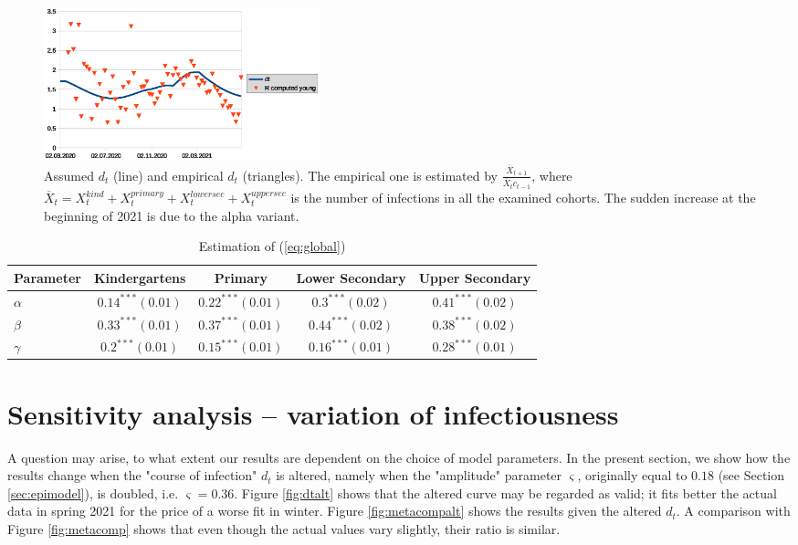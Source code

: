 \documentclass[fleqn,10pt]{wlscirep}
\begin{document}
\begin{figure}
\begin{center}
\includegraphics[width=8cm]{dt.eps} 
\caption{Assumed $d_t$ (line) and  empirical $d_t$ (triangles). The empirical one is estimated by 
$\frac{\overline{X}_{t+1}}{\overline{X}_{t} c_{t-1}}$, where $\overline{X}_{t}=X^{kind}_t+X^{primary}_t+X^{lowersec}_t+X^{uppersec}_t$ is the number of infections in all the examined cohorts. The sudden increase at the beginning of 2021 is due to the alpha variant.
}
\label{fig:dt}
\end{center}
\end{figure}

\begin{table}
\begin{center}
\begin{tabular}{l|cccc} Parameter & Kindergartens & Primary & Lower Secondary & Upper Secondary \\ \hline 
$\alpha$& $0.14^{***}(0.01)$& $0.22^{***}(0.01)$& $0.3^{***}(0.02)$& $0.41^{***}(0.02)$\\
$\beta$& $0.33^{***}(0.01)$& $0.37^{***}(0.01)$& $0.44^{***}(0.02)$& $0.38^{***}(0.02)$\\
$\gamma$& $0.2^{***}(0.01)$& $0.15^{***}(0.01)$& $0.16^{***}(0.01)$& $0.28^{***}(0.01)$\\
\end{tabular}
\caption{Estimation of (\ref{eq:global})}
\label{tab:global}
\end{center}
\end{table}



\section{Sensitivity analysis -- variation of infectiousness}
\label{sec:sd}

A question may arise, to what extent our results are dependent on the choice of model parameters. In the present section, we show how the results change when the "course of infection" $d_t$ is altered, namely when the "amplitude" parameter $\varsigma$, originally equal to $0.18$ (see Section \ref{sec:epimodel}), is doubled, i.e. $\varsigma=0.36$. Figure \ref{fig:dtalt} shows that the altered curve may be regarded as valid; it  fits better the actual data in spring 2021 for the price of a worse fit in winter. Figure \ref{fig:metacompalt} shows the results given the altered $d_t$. A comparison with Figure \ref{fig:metacomp} shows that even though the actual values vary slightly, their ratio is similar. 
\end{document}
